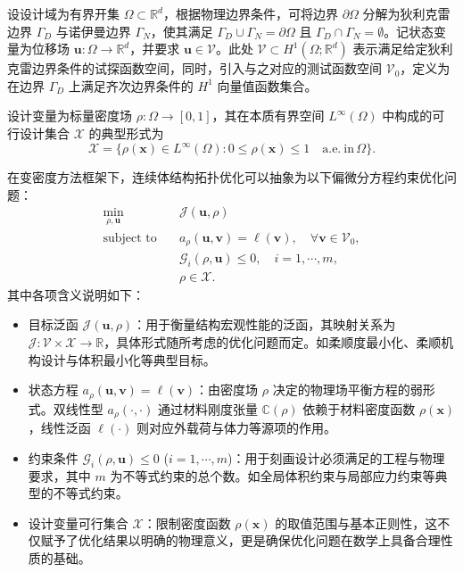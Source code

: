 设设计域为有界开集 $\Omega\subset\mathbb{R}^d$，根据物理边界条件，可将边界 $\partial\Omega$ 分解为狄利克雷边界 $\Gamma_D$ 与诺伊曼边界 $\Gamma_N$，使其满足  $\Gamma_D \cup \Gamma_N = \partial\Omega$  且 $\Gamma_D \cap \Gamma_N = \emptyset$。记状态变量为位移场 $\boldsymbol{u}:\Omega\to\mathbb{R}^d$，并要求 $\boldsymbol{u} \in \mathcal{V}$。此处 $\mathcal{V} \subset H^1(\Omega;\mathbb{R}^d)$ 表示满足给定狄利克雷边界条件的试探函数空间，同时，引入与之对应的测试函数空间 $\mathcal{V}_0$，定义为在边界 $\Gamma_D$ 上满足齐次边界条件的 $H^1$ 向量值函数集合。

设计变量为标量密度场 $\rho:\Omega\to[0,1]$，其在本质有界空间 $L^\infty(\Omega)$ 中构成的可行设计集合 $\mathcal{X}$ 的典型形式为
\[
\mathcal{X} = \{\rho(\boldsymbol{x})\in{L}^\infty(\Omega):0\leq\rho(\boldsymbol{x})\le1\quad\text{a.e.}~\text{in}\,\Omega\}.
\]

在变密度方法框架下，连续体结构拓扑优化可以抽象为以下偏微分方程约束优化问题：
\begin{equation} \label{eq:ch6_general_topology_optimization}
	\begin{aligned}
		\min_{\rho,\boldsymbol{u}}\quad&\mathcal{J}(\boldsymbol{u}, \rho)\\
		\text{subject~to}\quad&
		a_\rho(\boldsymbol{u},\boldsymbol{v}) = \ell(\boldsymbol{v}),\quad\forall\boldsymbol{v}\in\mathcal{V}_0,\\
		&\mathcal{G}_i(\rho,\boldsymbol{u})\leq0,\quad{i}=1,\cdots,m,\\
		&\rho\in\mathcal{X}.
	\end{aligned}
\end{equation}
其中各项含义说明如下：
\begin{itemize}
	\item 目标泛函 $\mathcal{J}(\boldsymbol{u}, \rho)$：用于衡量结构宏观性能的泛函，其映射关系为 $\mathcal{J}:\mathcal{V}\times\mathcal{X}\to\mathbb{R}$，具体形式随所考虑的优化问题而定。如柔顺度最小化、柔顺机构设计与体积最小化等典型目标。

	\item 状态方程 $a_\rho(\boldsymbol{u},\boldsymbol{v}) = \ell(\boldsymbol{v})$：由密度场 $\rho$ 决定的物理场平衡方程的弱形式。双线性型 $a_\rho(\cdot,\cdot)$ 通过材料刚度张量 $\mathbb{C}(\rho)$ 依赖于材料密度函数 $\rho(\boldsymbol{x})$，线性泛函 $\ell(\cdot)$ 则对应外载荷与体力等源项的作用。
	
	\item 约束条件 $\mathcal{G}_i(\rho,\boldsymbol{u})\leq 0$ ($i=1,\cdots,m$)：用于刻画设计必须满足的工程与物理要求，其中 $m$ 为不等式约束的总个数。如全局体积约束与局部应力约束等典型的不等式约束。
	
	\item 设计变量可行集合 $\mathcal{X}$：限制密度函数 $\rho(\boldsymbol{x})$ 的取值范围与基本正则性，这不仅赋予了优化结果以明确的物理意义，更是确保优化问题在数学上具备合理性质的基础。
\end{itemize}


